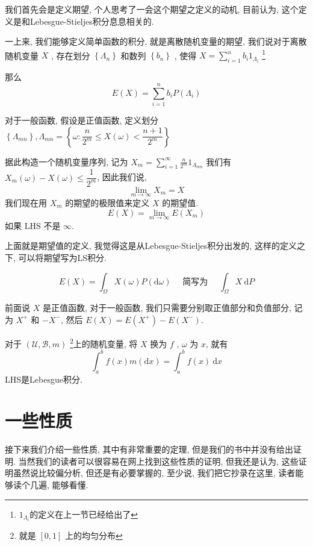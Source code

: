 \documentclass[a4paper, 10pt]{ctexart} %
\begin{document}
    我们首先会是定义期望, 个人思考了一会这个期望之定义的动机, 目前认为, 这个定义是和Lebesgue-Stieljes积分息息相关的. 

    一上来, 我们能够定义简单函数的积分, 就是离散随机变量的期望, 我们说对于离散随机变量 $X$ , 存在划分 $\left\{\Lambda_n\right\}$ 和数列 $\left\{b_n\right\}$
    , 使得 $X = \sum_{i=1} ^{n}b_i 1_{\Lambda_i}$ \footnote{$1_{\Lambda_i}$的定义在上一节已经给出了}

    那么 
    \[
    E \left(X\right) = \sum_{i=1} ^{n} b_i P\left( \Lambda _{i}\right)
    \]

    对于一般函数, 假设是正值函数, 定义划分 $\left\{\Lambda_{mn} \right\}, \Lambda_{mn} = \left\{\omega : \dfrac{n}{2^{m}} \le X\left(\omega\right) < \dfrac{n+1}{2^{m}} \right\}$

    据此构造一个随机变量序列, 记为 $\displaystyle X _{m} = \sum_{i=1} ^{\infty} \frac{n}{2 ^{m}} 1_{\Lambda_{mn}}$
    我们有 $X _{m} \left(\omega\right) - X \left( \omega\right) \le \dfrac{1}{2^{m}}$, 因此我们说, 
    \[
    \lim _{m \to \infty} X_{m} = X
    \]
    我们现在用 $X _{m}$ 的期望的极限值来定义 $X$ 的期望值. 
    \[
    E \left(X\right) = \lim_{ m \to \infty} E \left(X _{m}\right)
    \]
    如果 $\text{LHS}$ 不是 $\infty$. 

    上面就是期望值的定义, 我觉得这是从Lebesgue-Stieljes积分出发的, 这样的定义之下, 可以将期望写为LS积分. 

    \[
    E \left(X\right) = \int _{\Omega} X \left(\omega\right) P\left(\mathrm{d} \omega\right)\quad \text{ 简写为 } \quad \int _{\Omega} X \ \mathrm{d} P 
    \]

    前面说 $X$ 是正值函数, 对于一般函数, 我们只需要分别取正值部分和负值部分, 记为 $X ^{+}$ 和 $-X ^{-}$, 然后 $E (X)  = E \left( X ^{+}\right) - E \left(X ^{-}\right)$. 

    对于 $ \left(\mathcal U ,  \mathcal B , m\right)$ \footnote{就是 $[0,1]$ 上的均匀分布}上的随机变量, 将 $X$ 换为 $f$ ,  $\omega$ 为 $x$, 就有
    \[
    \int _{a}^{b} f\left(x\right) m \left( \mathrm{d}x\right) = \int ^{b}_{a} f\left(x\right) \ \mathrm{d}x
    \]
    LHS是Lebesgue积分. 


    \section{一些性质}
    接下来我们介绍一些性质, 其中有非常重要的定理, 但是我们的书中并没有给出证明. 当然我们的读者可以很容易在网上找到这些性质的证明, 但我还是认为, 这些证明虽然说比较偏分析, 但还是有必要掌握的, 
    至少说, 我们把它抄录在这里, 读者能够读个几遍, 能够看懂. 
\end{document}
